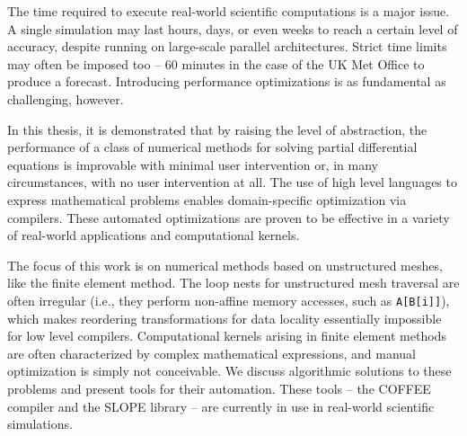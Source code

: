 The time required to execute real-world scientific computations is a major issue. A single simulation may last hours, days, or even weeks to reach a certain level of accuracy, despite running on large-scale parallel architectures. Strict time limits may often be imposed too -- 60 minutes in the case of the UK Met Office to produce a forecast. Introducing performance optimizations is as fundamental as challenging, however. 

In this thesis, it is demonstrated that by raising the level of abstraction, the performance of a class of numerical methods for solving partial differential equations is improvable with minimal user intervention or, in many circumstances, with no user intervention at all. The use of high level languages to express mathematical problems enables domain-specific optimization via compilers. These automated optimizations are proven to be effective in a variety of real-world applications and computational kernels.

The focus of this work is on numerical methods based on unstructured meshes, like the finite element method. The loop nests for unstructured mesh traversal are often irregular (i.e., they perform non-affine memory accesses, such as {\tt A[B[i]]}), which makes reordering transformations for data locality essentially impossible for low level compilers. Computational kernels arising in finite element methods are often characterized by complex mathematical expressions, and manual optimization is simply not conceivable. We discuss algorithmic solutions to these problems and present tools for their automation. These tools -- the COFFEE compiler and the SLOPE library -- are currently in use in real-world scientific simulations.

